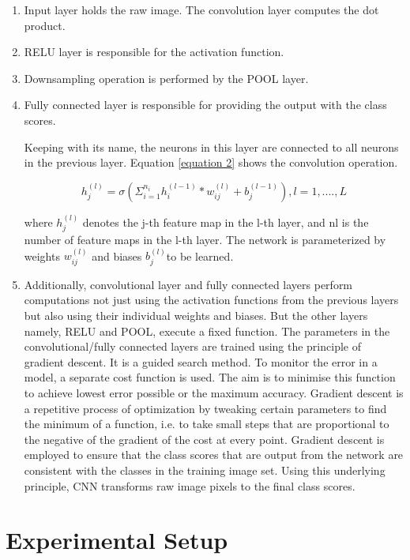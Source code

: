 \documentclass[conference]{IEEEtran}
\begin{document}
\begin{enumerate}

\item Input layer holds the raw image. The convolution layer computes the dot product.
\item RELU layer is responsible for the activation function.
\item Downsampling operation is performed by the POOL layer.
\item  Fully connected layer is responsible for providing the output with the class scores.

    Keeping with its name, the neurons in this layer are connected to all neurons in the previous layer. Equation \ref{equation 2} shows the convolution operation.


 

\begin{equation}
\label{equation 2}
h_j^{(l)} = \sigma(\Sigma_{i=1}^{n_i} h_i^{(l-1)} * w_{ij}^{(l)} + b_j^{(l-1)}) , l=1,....,L
\end{equation}

where $h^{(l)}_j$ denotes the j-th feature map in the l-th layer, and nl is the number of feature maps in the l-th layer. The network is parameterized by weights $w_{ij}^{(l)}$ and biases $b_j^{(l)}$to be learned\cite{lee2009convolutional}. 
\item Additionally, convolutional layer and fully connected layers perform computations not just using the activation functions from the previous layers but also using their individual weights and biases. But the other layers namely, RELU and POOL, execute a  fixed function. The parameters in the convolutional/fully connected layers are trained using the principle of gradient descent. It is a guided search method. To monitor the error in a model, a separate cost function is used. The aim is to minimise this function to achieve lowest error possible or the maximum accuracy. Gradient descent is a repetitive process of optimization by tweaking certain parameters to find the minimum of a function, i.e. to take small steps that are proportional to the negative of the gradient of the cost at every point. Gradient descent is employed to ensure that the class scores that are output from the network are consistent with the classes in the training image set. Using this underlying principle, CNN transforms raw image pixels to the final class scores. 

\end{enumerate}

\section{Experimental Setup}
\label{sec:4 Experimental Setup} 
\end{document}
